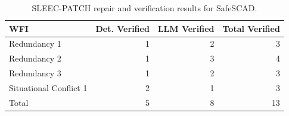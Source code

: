 \begin{table}[t]
\caption{SLEEC-PATCH repair and verification results for SafeSCAD.}
\label{tab:safescad-repair-verification-summary}
\centering
\begin{tabular}{lrrr}
\toprule
WFI & Det. Verified & LLM Verified & Total Verified \\
\midrule
Redundancy 1 & 1 & 2 & 3 \\
Redundancy 2 & 1 & 3 & 4 \\
Redundancy 3 & 1 & 2 & 3 \\
Situational Conflict 1 & 2 & 1 & 3 \\
\midrule
Total & 5 & 8 & 13 \\
\bottomrule
\end{tabular}
\end{table}
